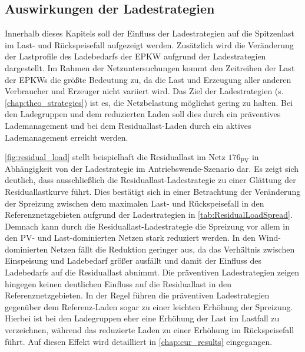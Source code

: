 


\subsection{Auswirkungen der Ladestrategien}\label{chap:results_charging_strategies}

Innerhalb dieses Kapitels soll der Einfluss der Ladestrategien auf die Spitzenlast im Last- und Rückspeisefall aufgezeigt werden.
Zusätzlich wird die Veränderung der Lastprofile des Ladebedarfs der \gls{EPKW} aufgrund der Ladestrategien dargestellt.
Im Rahmen der Netzuntersuchungen kommt den Zeitreihen der Last der \glspl{EPKW} die größte Bedeutung zu, da die Last und Erzeugung aller anderen Verbraucher und Erzeuger nicht variiert wird.
Das Ziel der Ladestrategien (s. \autoref{chap:theo_strategies}) ist es, die Netzbelastung möglichst gering zu halten.
Bei den Ladegruppen und dem reduzierten Laden soll dies durch ein präventives Lademanagement und bei dem Residuallast-Laden durch ein aktives Lademanagement erreicht werden.



\autoref{fig:residual_load} stellt beispielhaft die Residuallast im Netz \(176_{\text{PV}}\) in Abhängigkeit von der Ladestrategie im Antriebswende-Szenario dar.
Es zeigt sich deutlich, dass ausschließlich die Residuallast-Ladestrategie zu einer Glättung der Residuallastkurve führt.
Dies bestätigt sich in einer Betrachtung der Veränderung der Spreizung zwischen dem maximalen Last- und Rückspeisefall in den Referenznetzgebieten aufgrund der Ladestrategien in \autoref{tab:ResidualLoadSpread}.
Demnach kann durch die Residuallast-Ladestrategie die Spreizung vor allem in den \gls{PV}- und Last-dominierten Netzen stark reduziert werden.
In den Wind-dominierten Netzen fällt die Reduktion geringer aus, da das Verhältnis zwischen Einspeisung und Ladebedarf größer ausfällt und damit der Einfluss des Ladebedarfs auf die Residuallast abnimmt.
Die präventiven Ladestrategien zeigen hingegen keinen deutlichen Einfluss auf die Residuallast in den Referenznetzgebieten.
In der Regel führen die präventiven Ladestrategien gegenüber dem Referenz-Laden sogar zu einer leichten Erhöhung der Spreizung.
Hierbei ist bei den Ladegruppen eher eine Erhöhung der Last im Lastfall zu verzeichnen, während das reduzierte Laden zu einer Erhöhung im Rückspeisefall führt.
Auf diesen Effekt wird detailliert in \autoref{chap:cur_results} eingegangen.


